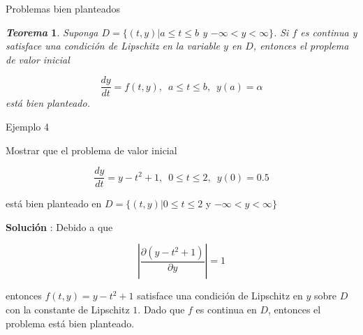 \documentclass{beamer}
\newtheorem{teorema}{\textit{\textbf{Teorema}}}
\begin{document}
\begin{frame}{Problemas bien planteados}

\begin{teorema}
	Suponga $D = \{(t,y) | a \leq t \leq b $ y $ -\infty < y < \infty \}$.  Si $f$ es continua y satisface una condición de Lipschitz en la variable $y$ en $D$, entonces el proplema de valor inicial
	
	\begin{displaymath}
	\dfrac{d y}{d t} = f(t,y), \,\,\, a \leq t \leq b, \,\,\, y(a) = \alpha
	\end{displaymath}
	está bien planteado.
\end{teorema}

\end{frame}

\begin{frame}{Ejemplo 4}

\begin{block}{}
Mostrar que el problema de valor inicial

\begin{equation}\label{eq:ivpEj4}
\dfrac{d y}{d t} = y - t^2 + 1, \,\,\, 0 \leq t \leq 2, \,\,\, y(0) = 0.5
\end{equation}

está bien planteado en $D = \{(t,y) | 0 \leq t \leq 2 $ y $ -\infty < y < \infty \}$
\end{block}

\pause 

	\textbf{Soluci\'on} : Debido a que
	
	\begin{displaymath}
	\left| \dfrac{\partial(y-t^2+1)}{\partial y} \right| = 1
	\end{displaymath}

entonces $f(t,y) = y - t^2 + 1$ satisface una condición de Lipschitz en $y$ sobre $D$ con la constante de Lipschitz $1$. Dado que $f$ es continua en $D$, entonces el problema está bien planteado.

\end{frame}
\end{document}
